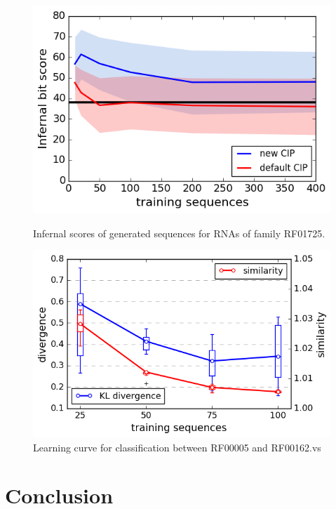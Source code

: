 \documentclass{article}
\begin{document}
\begin{figure}[ht]
      \centering
  \begin{minipage}[b]{0.47\textwidth}
    \includegraphics[width=\textwidth]{images/infernal_abstr.png}
    \caption{Infernal scores of generated sequences for RNAs of family RF01725.}
      \label{infeval}
  \end{minipage}
  \hfill
  \begin{minipage}[b]{0.52\textwidth}
    \includegraphics[width=\textwidth]{images/learningcurve.png}
    \caption{Learning curve for classification between RF00005 and RF00162.vs}
     \label{learncurve}
  \end{minipage}
\end{figure}

 
\section{Conclusion}
\end{document}
